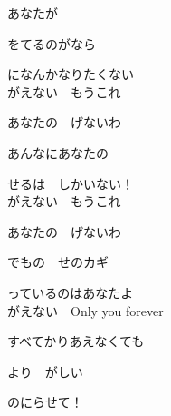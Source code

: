 {あなたが

をてるのがなら　

になんかなりたくない
\\

がえない　もうこれ　

あなたの　げないわ

あんなにあなたの　

せるは　しかいない！
\\

がえない　もうこれ　

あなたの　げないわ

でもの　せのカギ　

っているのはあなたよ
\\

がえない　Only you forever　

すべてかりあえなくても

より　がしい　

のにらせて！

}